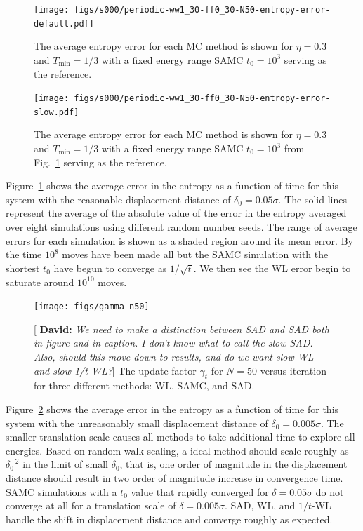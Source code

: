 \documentclass[letterpaper,twocolumn,amsmath,amssymb,pre,aps,10pt]{revtex4-1}
\newcommand{\green}[1]{{\bf \color{green} #1}}
\newcommand{\davidsays}[1]{{\color{red} [\green{David:} \emph{#1}]}}
\begin{document}
\begin{figure}
  \texttt{[image: figs/s000/periodic-ww1\_30-ff0\_30-N50-entropy-error-default.pdf]}
  \caption{The average entropy error for each MC method is shown for $\eta = 0.3$ and $T_{\min} = 1/3$ with
  a fixed energy range SAMC $t_0 = 10^3$ serving as the reference.}\label{fig:N50-ff0.3-avg-error}
\end{figure}
\begin{figure}
  \texttt{[image: figs/s000/periodic-ww1\_30-ff0\_30-N50-entropy-error-slow.pdf]}
  \caption{The average entropy error for each MC method is shown for $\eta = 0.3$ and $T_{\min} = 1/3$ with
  a fixed energy range SAMC $t_0 = 10^3$ from Fig.~\ref{fig:N50-ff0.3-avg-error}
  serving as the reference.}\label{fig:N50-ff0.3-avg-error-slow}
\end{figure}

Figure~\ref{fig:N50-ff0.3-avg-error} shows the average error in the
entropy as a function of time for this system with the reasonable
displacement distance of $\delta_0 = 0.05\sigma$.  The solid lines
represent the average of the absolute value of the error in the
entropy averaged over eight simulations using different random number
seeds.  The range of average errors for each simulation is shown as a
shaded region around its mean error.  By the time $10^8$ moves have
been made all but the SAMC simulation with the shortest $t_0$ have
begun to converge as $1/\sqrt{t}$.  We then see the WL error begin to
saturate around $10^{10}$ moves.

\begin{figure}
  \texttt{[image: figs/gamma-n50]}
  \caption{\davidsays{We need to make a distinction between SAD and
      SAD both in figure and in caption.  I don't know what to call
      the slow SAD.  Also, should this move down to results, and do we
      want slow WL and slow-1/t WL?} The update factor $\gamma_t$ for
    $N=50$ versus iteration for three different methods: WL, SAMC, and
    SAD.}\label{fig:fast-slow-gamma}
\end{figure}

Figure~\ref{fig:N50-ff0.3-avg-error-slow} shows the average error in
the entropy as a function of time for this system with the
unreasonably small displacement distance of $\delta_0 = 0.005\sigma$.
%
The smaller translation scale causes all methods to take additional
time to explore all energies. Based on random walk scaling, a ideal
method should scale roughly as $\delta_0^{-2}$ in the limit of small
$\delta_0$, that is, one order of magnitude in the displacement
distance should result in two order of magnitude increase in
convergence time. SAMC simulations with a $t_0$ value that rapidly
converged for $\delta = 0.05\sigma$ do not converge at all for a
translation scale of $\delta = 0.005\sigma$. SAD, WL, and $1/t$-WL
handle the shift in displacement distance and converge roughly as
expected.
\end{document}
